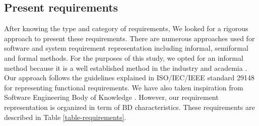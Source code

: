 \documentclass[a4paper,11pt,article,oneside]{memoir}
\begin{document}
\subsection{Present requirements}
After knowing the type and category of requirements, We looked for a rigorous approach to present these requirements. There are numerous approaches used for software and system requirement representation including informal, semiformal and formal methods. For the purposes of this study, we opted for an informal method because it is a well established method in the industry and academia \cite{kassab2014state}. Our approach follows the guidelines explained in ISO/IEC/IEEE standard 29148 \cite{ISO29148} for representing functional requirements. We have also taken inspiration from Software Engineering Body of Knowledge \cite{abran2004software}. However, our requirement representation is organized in term of BD characteristics. These requirements are described in Table \ref{table-requirements}.
\end{document}

